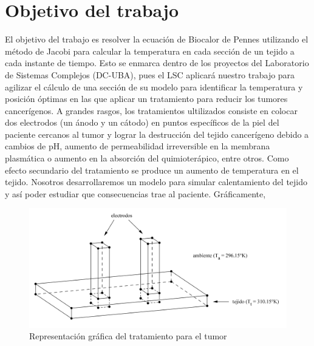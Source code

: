\documentclass[a4paper]{article}
\begin{document}
\newtheorem{teo}{Teorema}[section]
\newtheorem{propo}{Proposici\'{o}n}[section]
\newtheorem{lema}{Lema}[section]
\newtheorem{coro}{Corolario}[section]
\newtheorem{defi}{Definici\'{o}n}[section]

\newpage
\setcounter{page}{1}
\pagestyle{plain}

\newpage


\newcommand{\Asig}{\ensuremath{\leftarrow}}
\newcommand{\AndY}{\ensuremath{\wedge}}
\newcommand{\Or}{\ensuremath{\vee}}
\newcommand{\Not}{\ensuremath{\neg}}
\newcommand{\NotEq}{\ensuremath{\neq}}
\newcommand{\MayorIg}{\ensuremath{\geq}}
\newcommand{\tabu}{\hspace*{0.7cm}}
\newcommand{\ctabu}{\hspace*{0.8cm}}
\newcommand{\htabu}{\hspace*{0.35cm}}
\newcommand{\moduloNombre}[1]{\textbf{#1}}

\section{Objetivo del trabajo}

El objetivo del trabajo es resolver la ecuación de Biocalor de Pennes 
utilizando el método de Jacobi para calcular la temperatura en cada 
sección de un tejido a cada instante de tiempo. Esto se enmarca dentro 
de los proyectos del Laboratorio de Sistemas Complejos (DC-UBA), pues 
el LSC aplicará nuestro trabajo para agilizar el cálculo de una sección 
de su modelo para identificar la temperatura y posición óptimas en las 
que aplicar un tratamiento para reducir los tumores cancerígenos. A 
grandes rasgos, los tratamientos ultilizados consiste en colocar dos electrodos (un 
ánodo y un cátodo) en puntos específicos de la piel del paciente 
cercanos al tumor y lograr la destrucción del tejido cancerígeno 
debido a cambios de pH, aumento de permeabilidad irreversible en la 
membrana plasmática o aumento en la absorción del quimioterápico, 
entre otros. Como efecto secundario del tratamiento se produce un 
aumento de temperatura en el tejido. Nosotros desarrollaremos un 
modelo para simular calentamiento del tejido y así poder estudiar 
que consecuencias trae al paciente. Gráficamente,\\

\begin{figure}[!htbp]
  \centering
	\includegraphics[scale = 0.18]{tejido-anotado.png}
  \caption{Representación gráfica del tratamiento para el tumor}
\end{figure}
\end{document}
